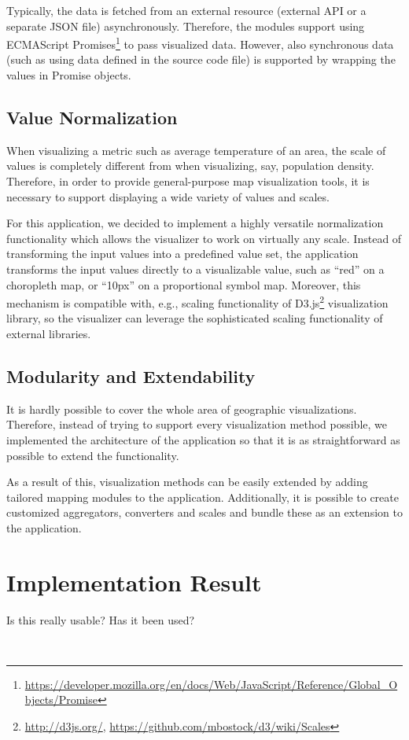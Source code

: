 Typically, the data is fetched from an external resource (external API or a separate JSON file) asynchronously. Therefore, the modules support using ECMAScript Promises\footnote{\url{https://developer.mozilla.org/en/docs/Web/JavaScript/Reference/Global_Objects/Promise}} to pass visualized data. However, also synchronous data (such as using data defined in the source code file) is supported by wrapping the values in Promise objects.

\subsection{Value Normalization}

When visualizing a metric such as average temperature of an area, the scale of values is completely different from when visualizing, say, population density. Therefore, in order to provide general-purpose map visualization tools, it is necessary to support displaying a wide variety of values and scales.

For this application, we decided to implement a highly versatile normalization functionality which allows the visualizer to work on virtually any scale. Instead of transforming the input values into a predefined value set, the application transforms the input values directly to a visualizable value, such as ``red'' on a choropleth map, or ``10px'' on a proportional symbol map. Moreover, this mechanism is compatible with, e.g., scaling functionality of D3.js\footnote{\url{http://d3js.org/}, \url{https://github.com/mbostock/d3/wiki/Scales}} visualization library, so the visualizer can leverage the sophisticated scaling functionality of external libraries.

\subsection{Modularity and Extendability}

It is hardly possible to cover the whole area of geographic visualizations. Therefore, instead of trying to support every visualization method possible, we implemented the architecture of the application so that it is as straightforward as possible to extend the functionality.

As a result of this, visualization methods can be easily extended by adding tailored mapping modules to the application. Additionally, it is possible to create customized aggregators, converters and scales and bundle these as an extension to the application.

\section{Implementation Result}

Is this really usable? Has it been used? 

~

